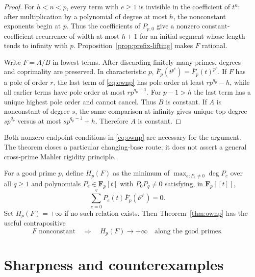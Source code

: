 \documentclass[11pt,reqno]{amsart}
\theoremstyle{definition}
\theoremstyle{remark}
\newcommand{\F}{\mathbf F}
\begin{document}
\begin{proof}
For $h<n<p$, every term with $e\geq1$ is invisible in the coefficient of
$t^n$: after multiplication by a polynomial of degree at most $h$, the
nonconstant exponents begin at $p$.  Thus the coefficients of $P_{p,0}$ give
a nonzero constant-coefficient recurrence of width at most $h+1$ for an
initial segment whose length tends to infinity with $p$.
Proposition~\ref{prop:prefix-lifting} makes $F$ rational.

Write $F=A/B$ in lowest terms.  After discarding finitely many primes,
degrees and coprimality are preserved.  In characteristic $p$,
$\overline F_p(t^{p^e})=\overline F_p(t)^{p^e}$.  If $F$ has a pole of
order $r$, the last term of \eqref{eq:ownp} has pole order at least
$rp^{q_p}-h$, while all earlier terms have pole order at most
$rp^{q_p-1}$.  For $p-1>h$ the last term has a unique highest pole order and
cannot cancel.  Thus $B$ is constant.  If $A$ is nonconstant of degree $s$,
the same comparison at infinity gives unique top degree
$sp^{q_p}$ versus at most $sp^{q_p-1}+h$.  Therefore $A$ is constant.
\end{proof}

Both nonzero endpoint conditions in \eqref{eq:ownp} are necessary for the
argument.  The theorem closes a particular changing-base route; it does not
assert a general cross-prime Mahler rigidity principle.

For a good prime $p$, define $H_p(F)$ as the minimum of
$\max_{e:P_e\ne0}\deg P_e$ over all $q\geq1$ and polynomials
$P_e\in\F_p[t]$ with $P_0P_q\ne0$ satisfying, in $\F_p[[t]]$,
\[
 \sum_{e=0}^{q}P_e(t)\overline F_p(t^{p^e})=0.
\]
Set $H_p(F)=+\infty$ if no such relation exists.  Then
Theorem~\ref{thm:ownp} has the useful contrapositive
\begin{equation}\label{eq:ownp-degree-escape}
 F\text{ nonconstant}\quad\Longrightarrow\quad
 H_p(F)\longrightarrow+\infty\quad\text{along the good primes}.
\end{equation}

\section{Sharpness and counterexamples}
\end{document}
